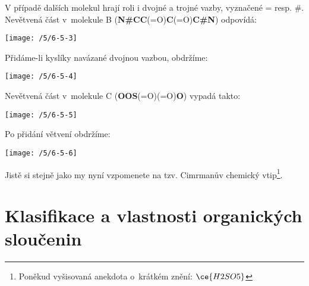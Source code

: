 \documentclass{book}
\begin{document}
V případě dalších molekul hrají roli i dvojné a trojné vazby, vyznačené
= resp. \#. Nevětvená část v~molekule B (\textbf{N\#CC}(=O)\textbf{C}(=O)\textbf{C\#N})
odpovídá: 
\begin{center}
\texttt{[image: /5/6-5-3]} 
\par\end{center}

Přidáme-li kyslíky navázané dvojnou vazbou, obdržíme: 
\begin{center}
\texttt{[image: /5/6-5-4]} 
\par\end{center}

Nevětvená část v~molekule C (\textbf{OOS}(=O)(=O)\textbf{O}) vypadá
takto: 
\begin{center}
\texttt{[image: /5/6-5-5]} 
\par\end{center}

Po přidání větvení obdržíme: 
\begin{center}
\texttt{[image: /5/6-5-6]} 
\par\end{center}

Jistě si stejně jako my nyní vzpomenete na tzv. Cimrmanův chemický
vtip\footnote{Poněkud vyšisovaná anekdota o~krátkém znění: $\ce{H2SO5}$}.

\section{Klasifikace a vlastnosti organických sloučenin}
\end{document}
